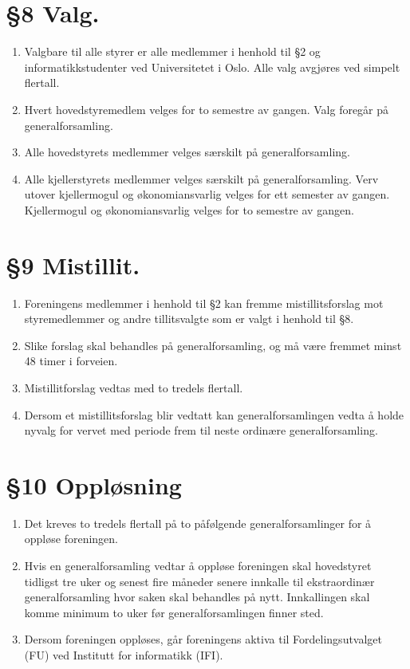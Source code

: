 \documentclass[10pt,norsk,a4paper]{article}
\begin{document}
\section*{§8 Valg.}
\begin{enumerate}
	\item{Valgbare til alle styrer er alle medlemmer i henhold til §2 og informatikkstudenter ved Universitetet i Oslo. Alle valg avgjøres ved simpelt flertall.}
	\item{Hvert hovedstyremedlem velges for to semestre av gangen. Valg foregår på generalforsamling.}
	\item{Alle hovedstyrets medlemmer velges særskilt på generalforsamling.}
	\item{Alle kjellerstyrets medlemmer velges særskilt på generalforsamling. Verv utover kjellermogul og økonomiansvarlig velges for ett semester av gangen. Kjellermogul og økonomiansvarlig velges for to semestre av gangen. }
\end{enumerate}

\section*{§9 Mistillit.}
\begin{enumerate}
    \item{Foreningens medlemmer i henhold til §2 kan fremme mistillitsforslag mot styremedlemmer og andre tillitsvalgte som er valgt i henhold til §8.}
    \item{Slike forslag skal behandles på generalforsamling, og må være fremmet minst 48 timer i forveien.}
    \item{Mistillitforslag vedtas med to tredels flertall.}
    \item{Dersom et mistillitsforslag blir vedtatt kan generalforsamlingen vedta å holde nyvalg for vervet med periode frem til neste ordinære generalforsamling.}
\end{enumerate}

\section*{§10 Oppløsning}
\begin{enumerate}
        \item{Det kreves to tredels flertall på to påfølgende generalforsamlinger for å oppløse foreningen.}
        \item{Hvis en generalforsamling vedtar å oppløse foreningen skal hovedstyret tidligst tre uker og senest fire måneder senere innkalle til ekstraordinær generalforsamling hvor saken skal behandles på nytt. Innkallingen skal komme minimum to uker før generalforsamlingen finner sted.}
        \item{Dersom foreningen oppløses, går foreningens aktiva til Fordelingsutvalget (FU) ved Institutt for informatikk (IFI).}
\end{enumerate}
\end{document}
